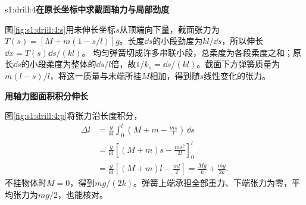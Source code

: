 \begin{drillsolution}{s1:drill:4}\textbf{在原长坐标中求截面轴力与局部劲度}\par\nobreak
图\ref{fig:s1:drill:4:s}用未伸长坐标$s$从顶端向下量，截面张力为$T(s)=[M+m(1-s/l)]g$。长度$\dd s$的小段劲度为$kl/\dd s$，所以伸长$\dd x=T(s)\dd s/(kl)$。
均匀弹簧切成许多串联小段，总柔度为各段柔度之和；原长$\dd s$的小段柔度为整体的$\dd s/l$倍，故$1/k_s=\dd s/(kl)$。截面下方弹簧质量为$m(l-s)/l$，将这一质量与末端所挂$M$相加，得到随$s$线性变化的张力。



\par\medskip{}\noindent\textbf{用轴力图面积积分伸长}\par\nobreak
图\ref{fig:s1:drill:4:p}将张力沿长度积分，
\[
\begin{aligned}
\Delta l&=\frac{g}{kl}\int_0^l\left(M+m-\frac{ms}{l}\right)\,\dd s\\
&=\frac{g}{kl}\left[(M+m)s-\frac{ms^2}{2l}\right]_0^l\\
&=\frac{g}{kl}\left[(M+m)l-\frac{ml}{2}\right]
=\frac{Mg}{k}+\frac{mg}{2k}.
\end{aligned}
\]
不挂物体时$M=0$，得到$mg/(2k)$。弹簧上端承担全部重力、下端张力为零，平均张力为$mg/2$，也能核对。\end{drillsolution}
